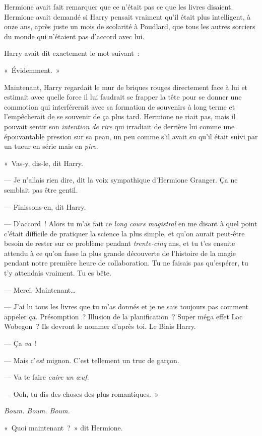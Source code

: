 Hermione avait fait remarquer que ce n'était pas ce que les livres disaient. Hermione avait demandé si Harry pensait vraiment qu'il était plus intelligent, à onze ans, après juste un mois de scolarité à Poudlard, que tous les autres sorciers du monde qui n'étaient pas d'accord avec lui.

Harry avait dit exactement le mot suivant~:

«~Évidemment.~»

Maintenant, Harry regardait le mur de briques rouges directement face à lui et estimait avec quelle force il lui faudrait se frapper la tête pour se donner une commotion qui interférerait avec sa formation de souvenirs à long terme et l'empêcherait de se souvenir de ça plus tard. Hermione ne riait pas, mais il pouvait sentir son \emph{intention de rire} qui irradiait de derrière lui comme une épouvantable pression sur sa peau, un peu comme s'il avait su qu'il était suivi par un tueur en série mais en \emph{pire}.

«~Vas-y, dis-le, dit Harry.

--- Je n'allais rien dire, dit la voix sympathique d'Hermione Granger. Ça ne semblait pas être gentil.

--- Finissons-en, dit Harry.

--- D'accord~! Alors tu m'as fait ce \emph{long cours magistral} en me disant à quel point c'était difficile de pratiquer la science la plus simple, et qu'on aurait peut-être besoin de rester sur ce problème pendant \emph{trente-cinq} ans, et tu t'es ensuite attendu à ce qu'on fasse la plus grande découverte de l'histoire de la magie pendant notre première heure de collaboration. Tu ne faisais pas qu'espérer, tu t'y attendais vraiment. Tu es bête.

--- Merci. Maintenant…

--- J'ai lu tous les livres que tu m'as donnés et je ne sais toujours pas comment appeler ça. Présomption~? Illusion de la planification~? Super méga effet Lac Wobegon~? Ils devront le nommer d'après toi. Le Biais Harry.

--- Ça \emph{va}~!

--- Mais c'\emph{est} mignon. C'est tellement un truc de garçon.

--- Va te faire \emph{cuire un œuf}.

--- Ooh, tu dis des choses des plus romantiques.~»

\emph{Boum. Boum. Boum.}

«~Quoi maintenant~?~» dit Hermione.

